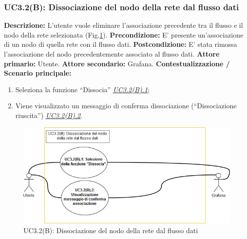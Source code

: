                
                    
                \subsubsection{UC3.2(B): Dissociazione del nodo della rete dal flusso dati}
                    \textbf{Descrizione:} L’utente vuole eliminare l'associazione precedente tra il flusso e il nodo della rete selezionata (Fig.\ref{uc3.2b}).
                    \newline
                    \textbf{Precondizione:} E' presente un'associazione di un nodo di quella rete con il flusso dati.
                    \newline
                    \textbf{Postcondizione:} E' stata rimossa l'associazione del nodo precedentemente associato al flusso dati.
                    \newline
                    \textbf{Attore primario:} Utente.
                    \newline
                    \textbf{Attore secondario:} Grafana.
                    \newline
                    \textbf{Contestualizzazione / Scenario principale:} 
                    \begin{enumerate}
                        \item Seleziona la funzione “Dissocia” \underline{\textit{UC3.2(B).1}};
                        \item Viene visualizzato un messaggio di conferma dissociazione (“Dissociazione riuscita”) \underline{\textit{UC3.2(B).2}}.   
                    \end{enumerate}    
                
                \begin{figure}[!htbp]
                	\centering
                	\includegraphics[width=\textwidth]{UC3-2(B).png}
                	\caption{UC3.2(B): Dissociazione del nodo della rete dal flusso dati}
                	\label{uc3.2b}
                \end{figure}
                
